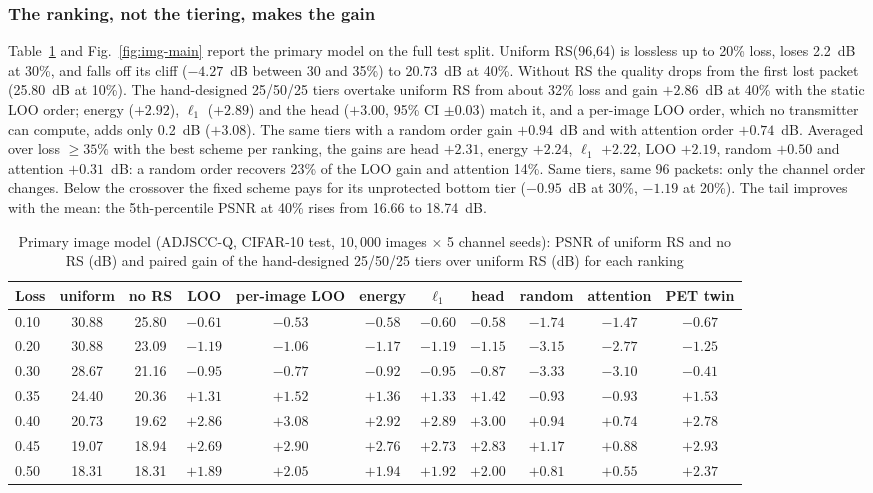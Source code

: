 \documentclass[journal]{IEEEtran}
\begin{document}
\subsubsection{The ranking, not the tiering, makes the gain}
Table~\ref{tab:img-headline} and Fig.~\ref{fig:img-main} report the primary model on the full test
split. Uniform RS(96,64) is lossless up to 20\% loss, loses 2.2~dB at 30\%, and falls off its cliff
($-4.27$~dB between 30 and 35\%) to 20.73~dB at 40\%. Without RS the quality drops from the first lost
packet (25.80~dB at 10\%). The hand-designed 25/50/25 tiers overtake uniform RS from about 32\% loss and
gain $+2.86$~dB at 40\% with the static LOO order; energy ($+2.92$), $\ell_1$ ($+2.89$) and the head
($+3.00$, 95\% CI $\pm0.03$) match it, and a per-image LOO order, which no transmitter can compute, adds
only 0.2~dB ($+3.08$). The same tiers with a random order gain $+0.94$~dB and with attention order
$+0.74$~dB. Averaged over loss $\ge35\%$ with the best scheme per ranking, the gains are head $+2.31$,
energy $+2.24$, $\ell_1$ $+2.22$, LOO $+2.19$, random $+0.50$ and attention $+0.31$~dB: a random order
recovers 23\% of the LOO gain and attention 14\%. Same tiers, same 96 packets: only the channel order
changes. Below the crossover the fixed scheme pays for its unprotected bottom tier ($-0.95$~dB at 30\%,
$-1.19$ at 20\%). The tail improves with the mean: the 5th-percentile PSNR at 40\% rises from 16.66 to
18.74~dB.

\begin{table}[t]\centering
\caption{Primary image model (ADJSCC-Q, CIFAR-10 test, $10{,}000$ images $\times$ 5 channel seeds): PSNR of
uniform RS and no RS (dB) and paired gain of the hand-designed 25/50/25 tiers over uniform RS (dB) for each ranking}
\label{tab:img-headline}
\begin{tabular}{lcccccccccc}\toprule
Loss & uniform & no RS & LOO & per-image LOO & energy & $\ell_1$ & head & random & attention & PET twin\\\midrule
0.10 & 30.88 & 25.80 & $-0.61$ & $-0.53$ & $-0.58$ & $-0.60$ & $-0.58$ & $-1.74$ & $-1.47$ & $-0.67$\\
0.20 & 30.88 & 23.09 & $-1.19$ & $-1.06$ & $-1.17$ & $-1.19$ & $-1.15$ & $-3.15$ & $-2.77$ & $-1.25$\\
0.30 & 28.67 & 21.16 & $-0.95$ & $-0.77$ & $-0.92$ & $-0.95$ & $-0.87$ & $-3.33$ & $-3.10$ & $-0.41$\\
0.35 & 24.40 & 20.36 & $+1.31$ & $+1.52$ & $+1.36$ & $+1.33$ & $+1.42$ & $-0.93$ & $-0.93$ & $+1.53$\\
0.40 & 20.73 & 19.62 & $+2.86$ & $+3.08$ & $+2.92$ & $+2.89$ & $+3.00$ & $+0.94$ & $+0.74$ & $+2.78$\\
0.45 & 19.07 & 18.94 & $+2.69$ & $+2.90$ & $+2.76$ & $+2.73$ & $+2.83$ & $+1.17$ & $+0.88$ & $+2.93$\\
0.50 & 18.31 & 18.31 & $+1.89$ & $+2.05$ & $+1.94$ & $+1.92$ & $+2.00$ & $+0.81$ & $+0.55$ & $+2.37$\\
\bottomrule\end{tabular}
\end{table}
\end{document}
